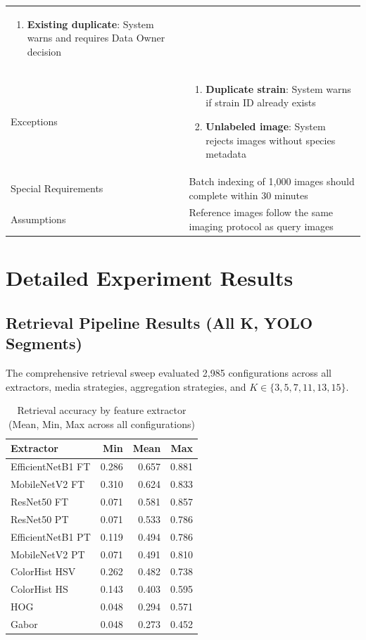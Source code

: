\begin{table}[H]
\begin{tabularx}{\textwidth}{@{}p{3cm} X@{}}
\begin{enumerate}[nosep]
  \item \textbf{Existing duplicate}: System warns and requires Data Owner decision
\end{enumerate} \\
Exceptions &
\begin{enumerate}[nosep]
  \item \textbf{Duplicate strain}: System warns if strain ID already exists
  \item \textbf{Unlabeled image}: System rejects images without species metadata
\end{enumerate} \\
Special Requirements & Batch indexing of 1,000 images should complete within 30 minutes \\
Assumptions & Reference images follow the same imaging protocol as query images \\
\bottomrule
\end{tabularx}
\end{table}

\section{Detailed Experiment Results}

\subsection{Retrieval Pipeline Results (All K, YOLO Segments)}

The comprehensive retrieval sweep evaluated 2,985 configurations across all
extractors, media strategies, aggregation strategies, and $K \in \{3,5,7,11,13,15\}$.

\begin{table}[H]
\centering
\caption{Retrieval accuracy by feature extractor (Mean, Min, Max across all configurations)}
\label{tab:app_by_extractor}
\small
\begin{tabular}{@{}l r r r@{}}
\toprule
\textbf{Extractor} & \textbf{Min} & \textbf{Mean} & \textbf{Max} \\
\midrule
EfficientNetB1 FT & 0.286 & 0.657 & 0.881 \\
MobileNetV2 FT    & 0.310 & 0.624 & 0.833 \\
ResNet50 FT       & 0.071 & 0.581 & 0.857 \\
ResNet50 PT       & 0.071 & 0.533 & 0.786 \\
EfficientNetB1 PT & 0.119 & 0.494 & 0.786 \\
MobileNetV2 PT    & 0.071 & 0.491 & 0.810 \\
ColorHist HSV     & 0.262 & 0.482 & 0.738 \\
ColorHist HS      & 0.143 & 0.403 & 0.595 \\
HOG               & 0.048 & 0.294 & 0.571 \\
Gabor             & 0.048 & 0.273 & 0.452 \\
\bottomrule
\end{tabular}
\end{table}

